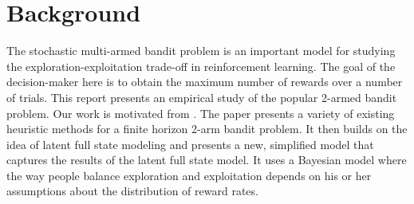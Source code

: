 \section{Background}
\label{background}

The stochastic multi-armed bandit problem is an important model for studying the exploration-exploitation trade-off in reinforcement learning. The goal of the decision-maker here is to obtain the maximum number of rewards over a number of trials. This report presents an empirical study of the popular 2-armed bandit problem. Our work is motivated from \cite{shunan2009}. The paper presents a variety of existing heuristic methods for a finite horizon 2-arm bandit problem. It then builds on the idea of latent full state modeling and presents a new, simplified model that captures the results of the latent full state model. It uses a Bayesian model where the way people balance exploration and exploitation depends on his or her assumptions about the distribution of reward rates. 



 